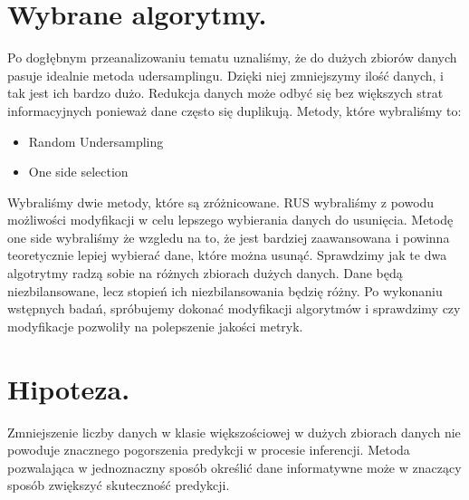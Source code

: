 \documentclass{article}
\begin{document}
\section{Wybrane algorytmy.}
Po dogłębnym przeanalizowaniu tematu uznaliśmy, że do dużych zbiorów danych pasuje idealnie metoda udersamplingu. Dzięki niej zmniejszymy ilość danych,  i tak jest ich bardzo dużo. Redukcja danych może odbyć się bez większych strat informacyjnych ponieważ dane często się duplikują.  Metody, które wybraliśmy to:
\begin{itemize}
    \item Random Undersampling
    \item One side selection
\end{itemize}
Wybraliśmy dwie metody, które są zróżnicowane. RUS wybraliśmy z powodu możliwości modyfikacji w celu lepszego wybierania danych do usunięcia. Metodę one side wybraliśmy że wzgledu na to, że jest bardziej zaawansowana i powinna teoretycznie lepiej wybierać dane, które można usunąć. Sprawdzimy jak te dwa algotrytmy radzą sobie na różnych zbiorach dużych danych. Dane będą niezbilansowane, lecz stopień ich niezbilansowania będzię różny. Po wykonaniu wstępnych badań, spróbujemy dokonać modyfikacji algorytmów i sprawdzimy czy modyfikacje pozwoliły na polepszenie jakości metryk.

\section{Hipoteza.}
Zmniejszenie liczby danych w klasie większościowej w dużych zbiorach danych nie powoduje znacznego pogorszenia predykcji w procesie inferencji. Metoda pozwalająca w jednoznaczny sposób określić dane informatywne może  w znaczący sposób zwiększyć skuteczność predykcji.



\end{document}
